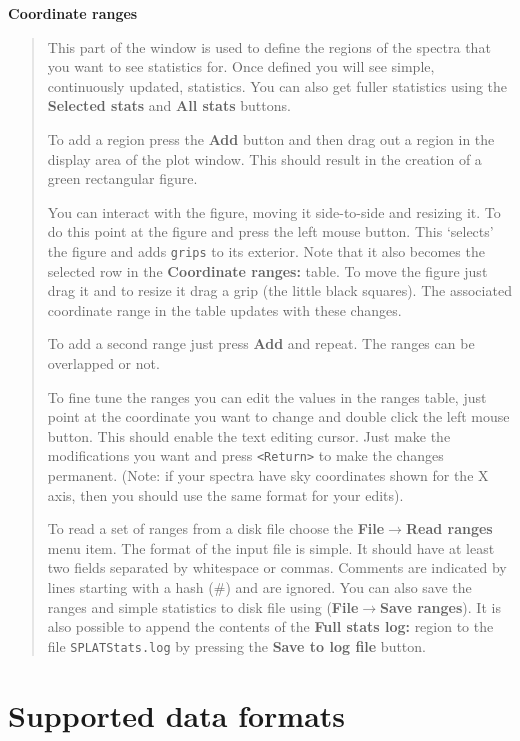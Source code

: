 \documentclass[twoside,11pt]{article}
\newcommand{\latexhtml}[2]{#1}
\newcommand{\xlabel}[1]{}
\renewcommand{\_}{\texttt{\symbol{95}}}
\newcommand{\submenuitem}[2]{\latexhtml{\textbf{#1$\rightarrow$#2}}{\textbf{#1->#2}}}
\newcommand{\labelitem}[1]{\textbf{#1}}
\newcommand{\hitext}[1]{\texttt{#1}}
\newcommand{\subheading}[1]{\textbf{\large{#1}}}
\begin{document}
\subheading{Coordinate ranges}
\begin{quote}
This part of the window is used to define the regions of the spectra
that you want to see statistics for. Once defined you will see simple,
continuously updated, statistics. You can also get fuller statistics using the
\labelitem{Selected stats} and \labelitem{All stats} buttons.

To add a region press the \labelitem{Add} button and then drag out a
region in the display area of the plot window. This should result in
the creation of a green rectangular figure.

You can interact with the figure, moving it side-to-side and resizing it. To
do this point at the figure and press the left mouse button. This `selects'
the figure and adds \hitext{grips} to its exterior. Note that it also becomes
the selected row in the \labelitem{Coordinate ranges:} table. To move the
figure just drag it and to resize it drag a grip (the little black
squares). The associated coordinate range in the table updates with these
changes.

To add a second range just press \labelitem{Add} and repeat. The ranges can be
overlapped or not.

To fine tune the ranges you can edit the values in the ranges table, just
point at the coordinate you want to change and double click the left mouse
button. This should enable the text editing cursor. Just make the
modifications you want and press \hitext{<Return>} to make the changes
permanent. (Note: if your spectra have sky coordinates shown for the X axis,
then you should use the same format for your edits).

To read a set of ranges from a disk file choose the
\submenuitem{File}{Read ranges} menu item.
The format of the input file is simple. It should have at least two fields
separated by whitespace or commas. Comments are indicated by lines starting
with a hash (\#) and are ignored. You can also save the ranges and simple
statistics to disk file using (\submenuitem{File}{Save ranges}). It is also
possible to append the contents of the \labelitem{Full stats log:} region to
the file \hitext{SPLATStats.log} by pressing the \labelitem{Save to log file}
button.
\end{quote}

\newpage
\section{Supported data formats\xlabel{data_formats}}
\end{document}
